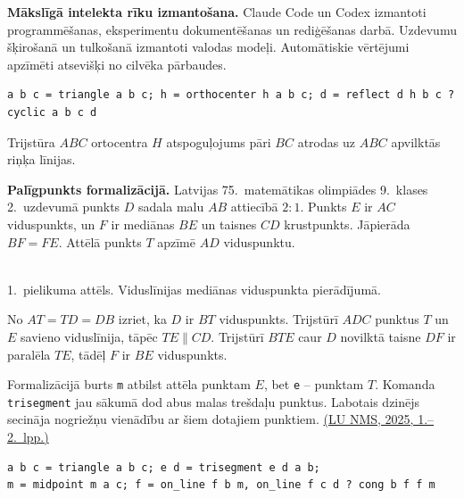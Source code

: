 \documentclass[nolabels]{../template/zpd}
\begin{document}
\noindent\textbf{Mākslīgā intelekta rīku izmantošana.} Claude Code un Codex izmantoti programmēšanas, eksperimentu dokumentēšanas un rediģēšanas darbā. Uzdevumu šķirošanā un tulkošanā izmantoti valodas modeļi. Automātiskie vērtējumi apzīmēti atsevišķi no cilvēka pārbaudes.

{\footnotesize\begin{verbatim}
a b c = triangle a b c; h = orthocenter h a b c; d = reflect d h b c ? cyclic a b c d
\end{verbatim}}
Trijstūra $ABC$ ortocentra $H$ atspoguļojums pāri $BC$ atrodas uz $ABC$ apvilktās riņķa līnijas.


\medskip
\noindent\textbf{Palīgpunkts formalizācijā.}
Latvijas 75.~matemātikas olimpiādes 9.~klases 2.~uzdevumā punkts $D$ sadala malu $AB$ attiecībā $2:1$.
Punkts $E$ ir $AC$ viduspunkts, un $F$ ir mediānas $BE$ un taisnes $CD$ krustpunkts.
Jāpierāda $BF=FE$. Attēlā punkts $T$ apzīmē $AD$ viduspunktu.

\begin{center}
\\[3pt]
{\small 1.~pielikuma attēls. Viduslīnijas mediānas viduspunkta pierādījumā.}
\end{center}

No $AT=TD=DB$ izriet, ka $D$ ir $BT$ viduspunkts. Trijstūrī $ADC$ punktus $T$ un $E$ savieno viduslīnija, tāpēc $TE\parallel CD$.
Trijstūrī $BTE$ caur $D$ novilktā taisne $DF$ ir paralēla $TE$, tādēļ $F$ ir $BE$ viduspunkts.

Formalizācijā burts \texttt{m} atbilst attēla punktam $E$, bet \texttt{e} -- punktam $T$.
Komanda \texttt{trisegment} jau sākumā dod abus malas trešdaļu punktus.
Labotais dzinējs secināja nogriežņu vienādību ar šiem dotajiem punktiem.
\href{https://www.nms.lu.lv/fileadmin/user_upload/lu_portal/projekti/nms.lu.lv/Arhivs/Olimpiades/VOL/2020-2030/VOL_75_uzd_ATR_9_12_klase.pdf\#page=1}{(LU NMS, 2025, 1.--2.~lpp.)}

{\footnotesize\begin{verbatim}
a b c = triangle a b c; e d = trisegment e d a b;
m = midpoint m a c; f = on_line f b m, on_line f c d ? cong b f f m
\end{verbatim}}
\end{document}
